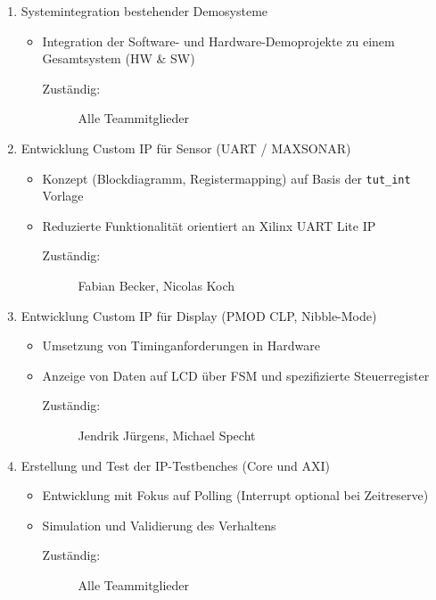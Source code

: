 \begin{enumerate}
   \item Systemintegration bestehender Demosysteme
   \begin{itemize}
     \item Integration der Software- und Hardware-Demoprojekte zu einem Gesamtsystem (HW \& SW)
     \begin{description}
       \item[Zuständig:] Alle Teammitglieder
     \end{description}
   \end{itemize}
   \item Entwicklung Custom IP für Sensor (UART / MAXSONAR)
   \begin{itemize}
     \item Konzept (Blockdiagramm, Registermapping) auf Basis der \texttt{tut\_int} Vorlage
     \item Reduzierte Funktionalität orientiert an Xilinx UART Lite IP
     \begin{description}
       \item[Zuständig:] Fabian Becker, Nicolas Koch
     \end{description}
   \end{itemize}
   \item Entwicklung Custom IP für Display (PMOD CLP, Nibble-Mode)
   \begin{itemize}
     \item Umsetzung von Timinganforderungen in Hardware
     \item Anzeige von Daten auf LCD über FSM und spezifizierte Steuerregister
     \begin{description}
       \item[Zuständig:] Jendrik Jürgens, Michael Specht
     \end{description}
   \end{itemize}
   \item Erstellung und Test der IP-Testbenches (Core und AXI)
   \begin{itemize}
     \item Entwicklung mit Fokus auf Polling (Interrupt optional bei Zeitreserve)
     \item Simulation und Validierung des Verhaltens
     \begin{description}
       \item[Zuständig:] Alle Teammitglieder
     \end{description}
   \end{itemize}

\end{enumerate}
